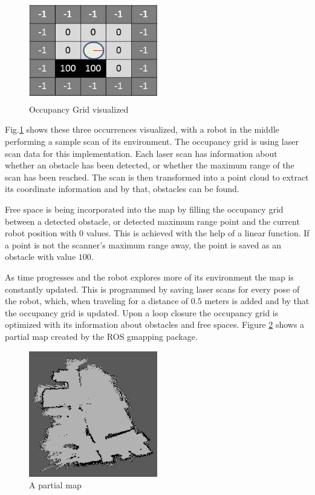 \documentclass{ba-kecs}
\begin{document}
\begin{figure}[htbp]
	\centering
		\includegraphics[width=0.50\textwidth,height = 44mm]{figures/Occup.png}
	\caption{Occupancy Grid visualized}
	\label{fig:Occupancy}
\end{figure}
Fig.\ref{fig:Occupancy} shows these three occurrences visualized, with a robot in the middle performing a sample scan of its environment.
The occupancy grid is using laser scan data for this implementation. Each laser scan has information about whether an obstacle has been detected, or whether the maximum range of the scan has been reached. The scan is then transformed into a point cloud to extract its coordinate information and by that, obstacles can be found.

Free space is being incorporated into the map by filling the occupancy grid between a detected obstacle, or detected maximum range point and the current robot position with $0$ values. This is achieved with the help of a linear function. If a point is not the scanner's maximum range away, the point is saved as an obstacle with value $100$.

As time progresses and the robot explores more of its environment the map is constantly updated. This is programmed by saving laser scans for every pose of the robot, which, when traveling for a distance of $0.5$ meters is added and by that the occupancy grid is updated. Upon a loop closure the occupancy grid is optimized with its information about obstacles and free spaces.
Figure \ref{fig:random_map} shows a partial map created by the ROS gmapping package.
\begin{figure}[htbp]
	\centering
		\includegraphics[width=0.50\textwidth]{figures/random_map.png}
	\caption{A partial map}
	\label{fig:random_map}
\end{figure}
\end{document}
